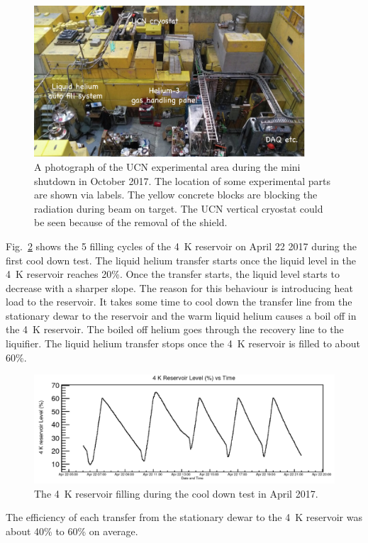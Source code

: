 \begin{figure}[h!]
  \centering
  \includegraphics[width=0.9\textwidth]{ucnarea.png}
  \caption{A photograph of the UCN experimental area during the mini
    shutdown in October 2017. The location of some experimental parts
    are shown via labels. The yellow concrete blocks are blocking the
    radiation during beam on target. The UCN vertical cryostat could
    be seen because of the removal of the shield. }
  \label{fig:ucnarea}
\end{figure}

Fig.~\ref{fig:4kfilling} shows the 5 filling cycles of the 4~K
reservoir on April 22 2017 during the first cool down test. The liquid
helium transfer starts once the liquid level in the 4~K reservoir
reaches 20\%. Once the transfer starts, the liquid level starts to
decrease with a sharper slope. The reason for this behaviour is
introducing heat load to the reservoir. It takes some time to cool
down the transfer line from the stationary dewar to the reservoir and
the warm liquid helium causes a boil off in the 4~K reservoir. The
boiled off helium goes through the recovery line to the liquifier. The
liquid helium transfer stops once the 4~K reservoir is filled to about
60\%.

\begin{figure}[h!]
  \centering
  \includegraphics[width=1.0\textwidth]{april_4kfilling.png}
  \caption{The 4~K reservoir filling during the cool down test in April 2017.}
  \label{fig:4kfilling}
\end{figure}
The efficiency of each transfer from the stationary dewar to the 4~K
reservoir was about 40\% to 60\% on average.

